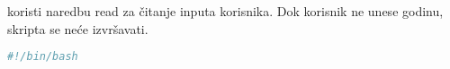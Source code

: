 \documentclass{exam}
\begin{document}
\begin{itemize}
                                                                        koristi
                                                                        naredbu
                                                                        read za
                                                                        čitanje
                                                                        inputa
                                                                        korisnika.
                                                                        Dok
                                                                        korisnik
                                                                        ne unese
                                                                        godinu,
                                                                        skripta
                                                                        se neće
                                                                        izvršavati.
                                                                        \begin{lstlisting}[language=bash,caption={Citanje
                                                                        inputa}]
                                                                        #!/bin/bash
                                                                        echo -n
                                                                        "Upisi
                                                                        godinu
                                                                        za koju
                                                                        te
                                                                        zanima
                                                                        koliko
                                                                        puta se
                                                                        dogodio
                                                                        petak
                                                                        13.: "
                                                                        read
                                                                        godina;


\end{lstlisting}
\end{itemize}
\end{document}
